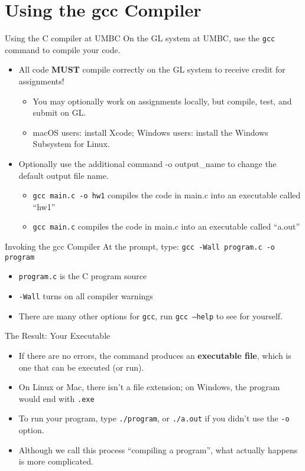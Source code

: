 \documentclass[graphics]{beamer}
\begin{document}
\section{Using the gcc Compiler}
\begin{frame}{Using the C compiler at UMBC}
    On the GL system at UMBC, use the \texttt{gcc} command to compile your code.
    \begin{itemize}
        \item All code \textbf{MUST} compile correctly on the GL system to receive credit for assignments!
        \begin{itemize}
            \item You may optionally work on assignments locally, but compile, test, and submit on GL.
            \item macOS users: install Xcode; Windows users: install the Windows Subsystem for Linux.
        \end{itemize}
        \item Optionally use the additional command -o output\_name to change the default output file name.
        \begin{itemize}
            \item \texttt{gcc main.c -o hw1} compiles the code in main.c into an executable called ``hw1''
            \item \texttt{gcc main.c} compiles the code in main.c into an executable called ``a.out''
        \end{itemize}
    \end{itemize}
\end{frame}

\begin{frame}{Invoking the gcc Compiler}
    At the prompt, type: \texttt{gcc -Wall program.c -o program}
    \begin{itemize}
        \item \texttt{program.c} is the C program source
        \item \texttt{-Wall} turns on all compiler warnings
        \item There are many other options for \texttt{gcc}, run \texttt{gcc --help} to see for yourself.
    \end{itemize}
\end{frame}

\begin{frame}{The Result: Your Executable}
    \begin{itemize}
        \item If there are no errors, the command produces an \textbf{executable file}, which is one that can be executed (or run).
        \item On Linux or Mac, there isn't a file extension; on Windows, the program would end with \texttt{.exe}
        \item To run your program, type \texttt{./program}, or \texttt{./a.out} if you didn't use the \texttt{-o} option.
        \item Although we call this process ``compiling a program'', what actually happens is more complicated.
    \end{itemize}
\end{frame}
\end{document}
